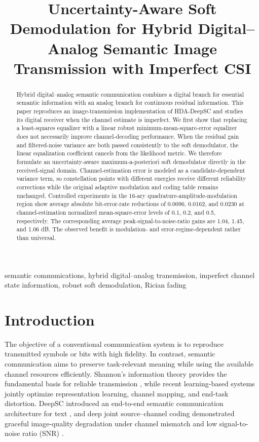 \documentclass[conference]{IEEEtran}
\title{Uncertainty-Aware Soft Demodulation for Hybrid Digital--Analog Semantic Image Transmission with Imperfect CSI}
\author{%
\IEEEauthorblockN{First Author, Second Author}
\IEEEauthorblockA{Department or School Name\\
University or Institution Name\\
City, Country\\
\{first.author, second.author\}@example.edu}
}
\begin{document}
\maketitle

\begin{abstract}
Hybrid digital--analog semantic communication combines a digital branch for essential semantic information with an analog branch for continuous residual information. This paper reproduces an image-transmission implementation of HDA-DeepSC and studies its digital receiver when the channel estimate is imperfect. We first show that replacing a least-squares equalizer with a linear robust minimum-mean-square-error equalizer does not necessarily improve channel-decoding performance. When the residual gain and filtered-noise variance are both passed consistently to the soft demodulator, the linear equalization coefficient cancels from the likelihood metric. We therefore formulate an uncertainty-aware maximum-a-posteriori soft demodulator directly in the received-signal domain. Channel-estimation error is modeled as a candidate-dependent variance term, so constellation points with different energies receive different reliability corrections while the original adaptive modulation and coding table remains unchanged. Controlled experiments in the 16-ary quadrature-amplitude-modulation region show average absolute bit-error-rate reductions of 0.0096, 0.0162, and 0.0230 at channel-estimation normalized mean-square-error levels of 0.1, 0.2, and 0.5, respectively. The corresponding average peak-signal-to-noise-ratio gains are 1.04, 1.45, and 1.06 dB. The observed benefit is modulation- and error-regime-dependent rather than universal.
\end{abstract}

\begin{IEEEkeywords}
semantic communications, hybrid digital--analog transmission, imperfect channel state information, robust soft demodulation, Rician fading
\end{IEEEkeywords}

\section{Introduction}
The objective of a conventional communication system is to reproduce transmitted symbols or bits with high fidelity. In contrast, semantic communication aims to preserve task-relevant meaning while using the available channel resources efficiently. Shannon's information theory provides the fundamental basis for reliable transmission \cite{shannon1948}, while recent learning-based systems jointly optimize representation learning, channel mapping, and end-task distortion. DeepSC introduced an end-to-end semantic communication architecture for text \cite{xie2021deepsc}, and deep joint source--channel coding demonstrated graceful image-quality degradation under channel mismatch and low signal-to-noise ratio (SNR) \cite{bourtsoulatze2019deepjscc}.
\end{document}
